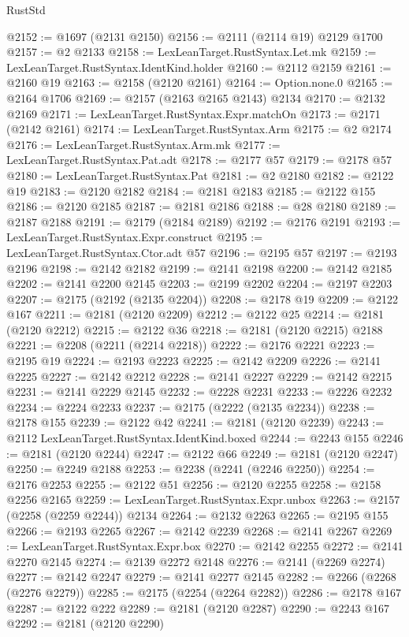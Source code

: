 \begin{lexlean}{RustStd}
\begin{coremodule}
@2152 := @1697 (@2131 @2150)
@2156 := @2111 (@2114 @19) @2129 @1700
@2157 := @2 @2133
@2158 := LexLeanTarget.RustSyntax.Let.mk
@2159 := LexLeanTarget.RustSyntax.IdentKind.holder
@2160 := @2112 @2159
@2161 := @2160 @19
@2163 := @2158 (@2120 @2161)
@2164 := Option.none.{0}
@2165 := @2164 @1706
@2169 := @2157 (@2163 @2165 @2143) @2134
@2170 := @2132 @2169
@2171 := LexLeanTarget.RustSyntax.Expr.matchOn
@2173 := @2171 (@2142 @2161)
@2174 := LexLeanTarget.RustSyntax.Arm
@2175 := @2 @2174
@2176 := LexLeanTarget.RustSyntax.Arm.mk
@2177 := LexLeanTarget.RustSyntax.Pat.adt
@2178 := @2177 @57
@2179 := @2178 @57
@2180 := LexLeanTarget.RustSyntax.Pat
@2181 := @2 @2180
@2182 := @2122 @19
@2183 := @2120 @2182
@2184 := @2181 @2183
@2185 := @2122 @155
@2186 := @2120 @2185
@2187 := @2181 @2186
@2188 := @28 @2180
@2189 := @2187 @2188
@2191 := @2179 (@2184 @2189)
@2192 := @2176 @2191
@2193 := LexLeanTarget.RustSyntax.Expr.construct
@2195 := LexLeanTarget.RustSyntax.Ctor.adt @57
@2196 := @2195 @57
@2197 := @2193 @2196
@2198 := @2142 @2182
@2199 := @2141 @2198
@2200 := @2142 @2185
@2202 := @2141 @2200 @2145
@2203 := @2199 @2202
@2204 := @2197 @2203
@2207 := @2175 (@2192 (@2135 @2204))
@2208 := @2178 @19
@2209 := @2122 @167
@2211 := @2181 (@2120 @2209)
@2212 := @2122 @25
@2214 := @2181 (@2120 @2212)
@2215 := @2122 @36
@2218 := @2181 (@2120 @2215) @2188
@2221 := @2208 (@2211 (@2214 @2218))
@2222 := @2176 @2221
@2223 := @2195 @19
@2224 := @2193 @2223
@2225 := @2142 @2209
@2226 := @2141 @2225
@2227 := @2142 @2212
@2228 := @2141 @2227
@2229 := @2142 @2215
@2231 := @2141 @2229 @2145
@2232 := @2228 @2231
@2233 := @2226 @2232
@2234 := @2224 @2233
@2237 := @2175 (@2222 (@2135 @2234))
@2238 := @2178 @155
@2239 := @2122 @42
@2241 := @2181 (@2120 @2239)
@2243 := @2112 LexLeanTarget.RustSyntax.IdentKind.boxed
@2244 := @2243 @155
@2246 := @2181 (@2120 @2244)
@2247 := @2122 @66
@2249 := @2181 (@2120 @2247)
@2250 := @2249 @2188
@2253 := @2238 (@2241 (@2246 @2250))
@2254 := @2176 @2253
@2255 := @2122 @51
@2256 := @2120 @2255
@2258 := @2158 @2256 @2165
@2259 := LexLeanTarget.RustSyntax.Expr.unbox
@2263 := @2157 (@2258 (@2259 @2244)) @2134
@2264 := @2132 @2263
@2265 := @2195 @155
@2266 := @2193 @2265
@2267 := @2142 @2239
@2268 := @2141 @2267
@2269 := LexLeanTarget.RustSyntax.Expr.box
@2270 := @2142 @2255
@2272 := @2141 @2270 @2145
@2274 := @2139 @2272 @2148
@2276 := @2141 (@2269 @2274)
@2277 := @2142 @2247
@2279 := @2141 @2277 @2145
@2282 := @2266 (@2268 (@2276 @2279))
@2285 := @2175 (@2254 (@2264 @2282))
@2286 := @2178 @167
@2287 := @2122 @222
@2289 := @2181 (@2120 @2287)
@2290 := @2243 @167
@2292 := @2181 (@2120 @2290)

\end{coremodule}
\end{lexlean}
